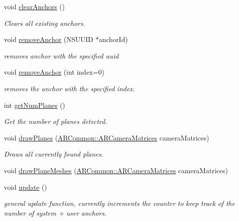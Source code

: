 \begin{DoxyCompactItemize}
void \mbox{\hyperlink{class_a_r_core_1_1_a_r_anchor_manager_af78ff242457a15c5073b8a2557a96974}{clear\+Anchors}} ()
\begin{DoxyCompactList}\small\item\em Clears all existing anchors. \end{DoxyCompactList}\item 
void \mbox{\hyperlink{class_a_r_core_1_1_a_r_anchor_manager_a28ed88e530bc1991e59f26e6b580d5c5}{remove\+Anchor}} (N\+S\+U\+U\+ID $\ast$anchor\+Id)
\begin{DoxyCompactList}\small\item\em removes anchor with the specified uuid \end{DoxyCompactList}\item 
void \mbox{\hyperlink{class_a_r_core_1_1_a_r_anchor_manager_a471d6e5694d6aecb810b65a909cf72b1}{remove\+Anchor}} (int index=0)
\begin{DoxyCompactList}\small\item\em removes the anchor with the specified index. \end{DoxyCompactList}\item 
int \mbox{\hyperlink{class_a_r_core_1_1_a_r_anchor_manager_a1da3445edbf4474d1207d30b691cfb4f}{get\+Num\+Planes}} ()
\begin{DoxyCompactList}\small\item\em Get the number of planes detected. \end{DoxyCompactList}\item 
void \mbox{\hyperlink{class_a_r_core_1_1_a_r_anchor_manager_a7ec2178e8754fa04b00cc600c60cb852}{draw\+Planes}} (\mbox{\hyperlink{struct_a_r_common_1_1_a_r_camera_matrices}{A\+R\+Common\+::\+A\+R\+Camera\+Matrices}} camera\+Matrices)
\begin{DoxyCompactList}\small\item\em Draws all currently found planes. \end{DoxyCompactList}\item 
void \mbox{\hyperlink{class_a_r_core_1_1_a_r_anchor_manager_a84a5f1c8b7fbe62c32aa901f2c97d612}{draw\+Plane\+Meshes}} (\mbox{\hyperlink{struct_a_r_common_1_1_a_r_camera_matrices}{A\+R\+Common\+::\+A\+R\+Camera\+Matrices}} camera\+Matrices)
\item 
void \mbox{\hyperlink{class_a_r_core_1_1_a_r_anchor_manager_af4b19656d608761d25661d6720a4c2f3}{update}} ()
\begin{DoxyCompactList}\small\item\em general update function, currently increments the counter to keep track of the number of system + user anchors. \end{DoxyCompactList}\item 

\end{DoxyCompactItemize}
